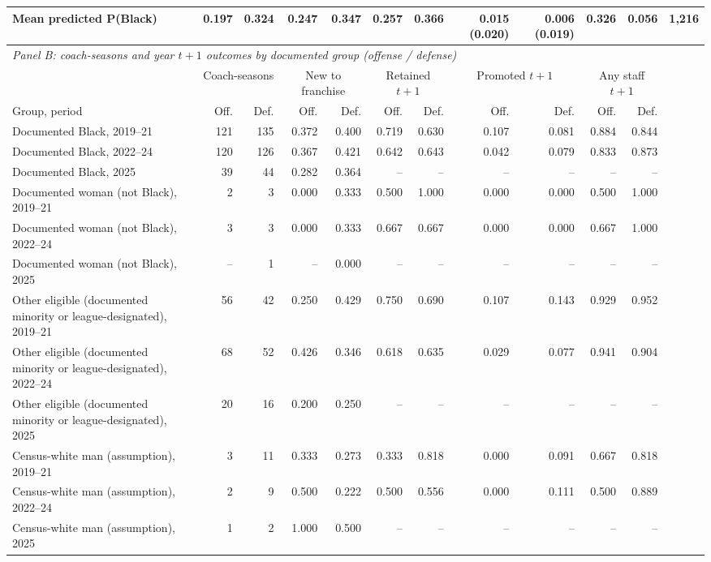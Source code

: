 \begin{table}[H]
{\begin{tabular}{lrrrrrrrrrrr}
Mean predicted P(Black) & 0.197 & 0.324 & 0.247 & 0.347 & 0.257 & 0.366 & 0.015 (0.020) & 0.006 (0.019) & 0.326 & 0.056 & 1,216 \\
\midrule
\multicolumn{12}{l}{\textit{Panel B: coach-seasons and year $t+1$ outcomes by documented group (offense / defense)}} \\
 & \multicolumn{2}{c}{Coach-seasons} & \multicolumn{2}{c}{New to franchise} & \multicolumn{2}{c}{Retained $t+1$} & \multicolumn{2}{c}{Promoted $t+1$} & \multicolumn{2}{c}{Any staff $t+1$} & \\
\cmidrule(lr){2-3} \cmidrule(lr){4-5} \cmidrule(lr){6-7} \cmidrule(lr){8-9} \cmidrule(lr){10-11}
Group, period & Off. & Def. & Off. & Def. & Off. & Def. & Off. & Def. & Off. & Def. & \\
Documented Black, 2019--21 & 121 & 135 & 0.372 & 0.400 & 0.719 & 0.630 & 0.107 & 0.081 & 0.884 & 0.844 &  \\
Documented Black, 2022--24 & 120 & 126 & 0.367 & 0.421 & 0.642 & 0.643 & 0.042 & 0.079 & 0.833 & 0.873 &  \\
Documented Black, 2025 & 39 & 44 & 0.282 & 0.364 & -- & -- & -- & -- & -- & -- &  \\
Documented woman (not Black), 2019--21 & 2 & 3 & 0.000 & 0.333 & 0.500 & 1.000 & 0.000 & 0.000 & 0.500 & 1.000 &  \\
Documented woman (not Black), 2022--24 & 3 & 3 & 0.000 & 0.333 & 0.667 & 0.667 & 0.000 & 0.000 & 0.667 & 1.000 &  \\
Documented woman (not Black), 2025 & -- & 1 & -- & 0.000 & -- & -- & -- & -- & -- & -- &  \\
Other eligible (documented minority or league-designated), 2019--21 & 56 & 42 & 0.250 & 0.429 & 0.750 & 0.690 & 0.107 & 0.143 & 0.929 & 0.952 &  \\
Other eligible (documented minority or league-designated), 2022--24 & 68 & 52 & 0.426 & 0.346 & 0.618 & 0.635 & 0.029 & 0.077 & 0.941 & 0.904 &  \\
Other eligible (documented minority or league-designated), 2025 & 20 & 16 & 0.200 & 0.250 & -- & -- & -- & -- & -- & -- &  \\
Census-white man (assumption), 2019--21 & 3 & 11 & 0.333 & 0.273 & 0.333 & 0.818 & 0.000 & 0.091 & 0.667 & 0.818 &  \\
Census-white man (assumption), 2022--24 & 2 & 9 & 0.500 & 0.222 & 0.500 & 0.556 & 0.000 & 0.111 & 0.500 & 0.889 &  \\
Census-white man (assumption), 2025 & 1 & 2 & 1.000 & 0.500 & -- & -- & -- & -- & -- & -- &  \\

\end{tabular}}
\end{table}
